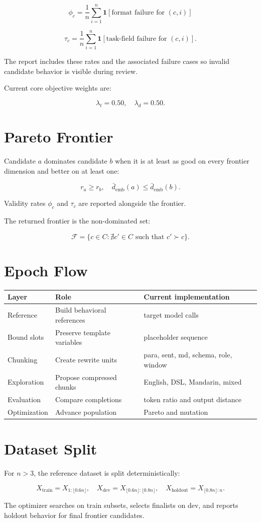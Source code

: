 \documentclass[11pt]{article}
\begin{document}
\[
\phi_c =
\frac{1}{n}\sum_{i=1}^{n}\mathbf{1}[\text{format failure for }(c,i)]
\]

\[
\tau_c =
\frac{1}{n}\sum_{i=1}^{n}\mathbf{1}[\text{task-field failure for }(c,i)].
\]

The report includes these rates and the associated failure cases so invalid
candidate behavior is visible during review.

Current core objective weights are:

\[
\lambda_t = 0.50,\quad
\lambda_d = 0.50.
\]

\section{Pareto Frontier}

Candidate \(a\) dominates candidate \(b\) when it is at least as good on every
frontier dimension and better on at least one:

\[
r_a \ge r_b,\quad
\bar{d}_{\mathrm{emb}}(a) \le \bar{d}_{\mathrm{emb}}(b).
\]

Validity rates \(\phi_c\) and \(\tau_c\) are reported alongside the frontier.

The returned frontier is the non-dominated set:

\[
\mathcal{F} =
\{c \in C : \nexists c' \in C \text{ such that } c' \succ c\}.
\]

\section{Epoch Flow}

\begin{center}
\begin{tabular}{lll}
\toprule
Layer & Role & Current implementation \\
\midrule
Reference & Build behavioral references & target model calls \\
Bound slots & Preserve template variables & placeholder sequence \\
Chunking & Create rewrite units & para, sent, md, schema, role, window \\
Exploration & Propose compressed chunks & English, DSL, Mandarin, mixed \\
Evaluation & Compare completions & token ratio and output distance \\
Optimization & Advance population & Pareto and mutation \\
\bottomrule
\end{tabular}
\end{center}

\section{Dataset Split}

For \(n > 3\), the reference dataset is split deterministically:

\[
X_{\mathrm{train}} = X_{1:\lfloor 0.6n \rfloor},
\quad
X_{\mathrm{dev}} = X_{\lfloor 0.6n \rfloor:\lfloor 0.8n \rfloor},
\quad
X_{\mathrm{holdout}} = X_{\lfloor 0.8n \rfloor:n}.
\]

The optimizer searches on train subsets, selects finalists on dev, and reports
holdout behavior for final frontier candidates.
\end{document}
